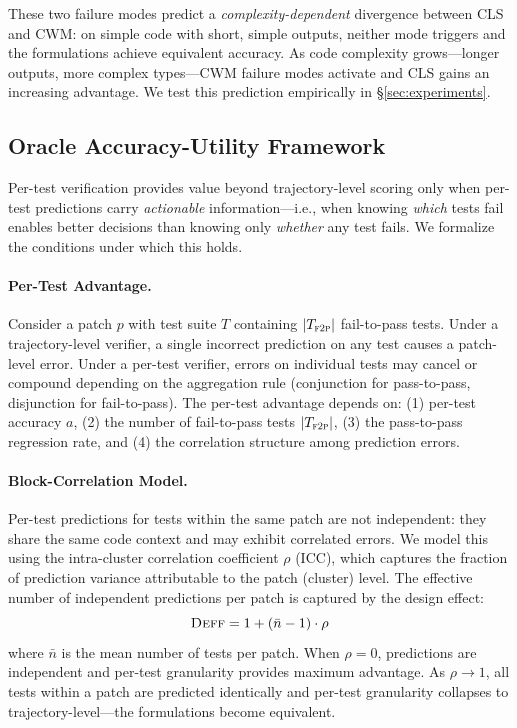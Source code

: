 These two failure modes predict a \emph{complexity-dependent} divergence between CLS and CWM: on simple code with short, simple outputs, neither mode triggers and the formulations achieve equivalent accuracy. As code complexity grows---longer outputs, more complex types---CWM failure modes activate and CLS gains an increasing advantage. We test this prediction empirically in \S\ref{sec:experiments}.

\subsection{Oracle Accuracy-Utility Framework}
\label{ssec:oracle}

Per-test verification provides value beyond trajectory-level scoring only when per-test predictions carry \emph{actionable} information---i.e., when knowing \emph{which} tests fail enables better decisions than knowing only \emph{whether} any test fails. We formalize the conditions under which this holds.

\paragraph{Per-Test Advantage.}
Consider a patch $p$ with test suite $T$ containing $|T_{\textsc{f2p}}|$ fail-to-pass tests. Under a trajectory-level verifier, a single incorrect prediction on any test causes a patch-level error. Under a per-test verifier, errors on individual tests may cancel or compound depending on the aggregation rule (conjunction for pass-to-pass, disjunction for fail-to-pass). The per-test advantage depends on: (1) per-test accuracy $a$, (2) the number of fail-to-pass tests $|T_{\textsc{f2p}}|$, (3) the pass-to-pass regression rate, and (4) the correlation structure among prediction errors.

\paragraph{Block-Correlation Model.}
Per-test predictions for tests within the same patch are not independent: they share the same code context and may exhibit correlated errors. We model this using the intra-cluster correlation coefficient $\rho$ (ICC), which captures the fraction of prediction variance attributable to the patch (cluster) level. The effective number of independent predictions per patch is captured by the design effect:
\begin{equation}
    \textsc{Deff} = 1 + (\bar{n} - 1) \cdot \rho
    \label{eq:deff}
\end{equation}
where $\bar{n}$ is the mean number of tests per patch. When $\rho = 0$, predictions are independent and per-test granularity provides maximum advantage. As $\rho \rightarrow 1$, all tests within a patch are predicted identically and per-test granularity collapses to trajectory-level---the formulations become equivalent.

